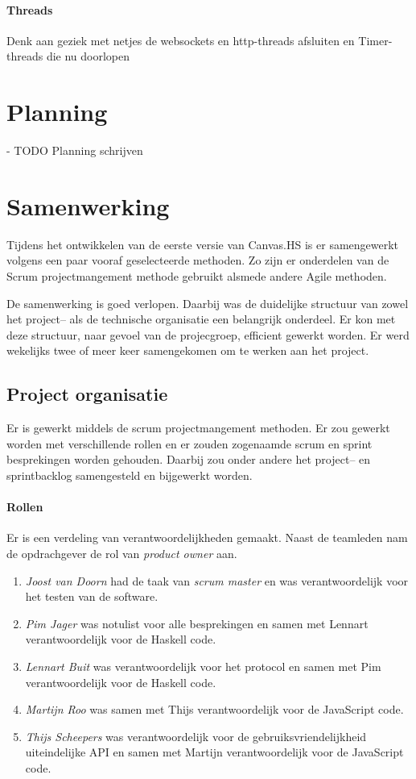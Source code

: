 \paragraph{Threads}
Denk aan geziek met netjes de websockets en http-threads afsluiten en Timer-threads die nu doorlopen
\section{Planning}
- TODO Planning schrijven
\section{Samenwerking}
Tijdens het ontwikkelen van de eerste versie van Canvas.HS is er samengewerkt volgens een paar vooraf geselecteerde methoden. Zo zijn er onderdelen van de Scrum projectmangement methode gebruikt alsmede andere Agile methoden.

De samenwerking is goed verlopen. Daarbij was de duidelijke structuur van zowel het project– als de technische organisatie een belangrijk onderdeel. Er kon met deze structuur, naar gevoel van de projecgroep, efficient gewerkt worden. Er werd wekelijks twee of meer keer samengekomen om te werken aan het project.

\subsection{Project organisatie}
Er is gewerkt middels de scrum projectmangement methoden. Er zou gewerkt worden met verschillende rollen en er zouden zogenaamde scrum en sprint besprekingen worden gehouden. Daarbij zou onder andere het project– en sprintbacklog samengesteld en bijgewerkt worden.

\paragraph{Rollen} Er is een verdeling van verantwoordelijkheden gemaakt. Naast de teamleden nam de opdrachgever de rol van \emph{product owner} aan.
\begin{enumerate}
    \item \emph{Joost van Doorn} had de taak van \emph{scrum master} en was verantwoordelijk voor het testen van de software.
    \item \emph{Pim Jager} was notulist voor alle besprekingen en samen met Lennart verantwoordelijk voor de Haskell code.
    \item \emph{Lennart Buit} was verantwoordelijk voor het protocol en samen met Pim verantwoordelijk voor de Haskell code.
    \item \emph{Martijn Roo} was samen met Thijs verantwoordelijk voor de JavaScript code.
    \item \emph{Thijs Scheepers} was verantwoordelijk voor de gebruiksvriendelijkheid uiteindelijke API en samen met Martijn verantwoordelijk voor de JavaScript code.
\end{enumerate}

